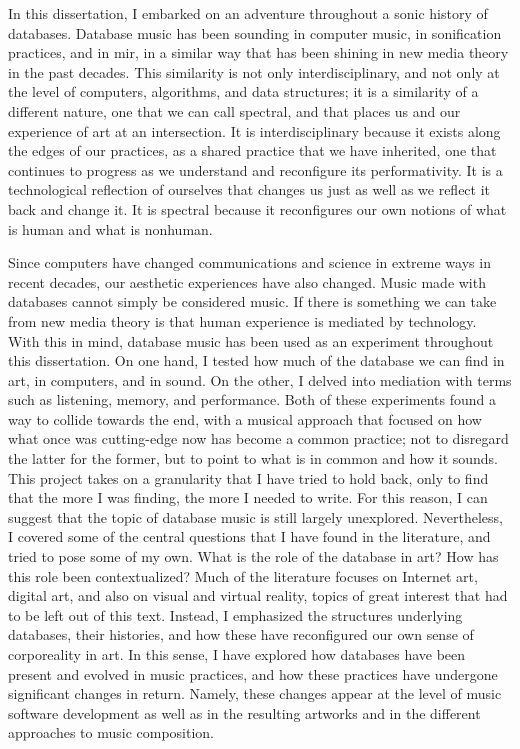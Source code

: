 In this dissertation, I embarked on an adventure throughout a sonic history of databases. Database music has been sounding in computer music, in sonification practices, and in \gls{mir}, in a similar way that has been shining in new media theory in the past decades. This similarity is not only interdisciplinary, and not only at the level of computers, algorithms, and data structures; it is a similarity of a different nature, one that we can call spectral, and that places us and our experience of art at an intersection. It is interdisciplinary because it exists along the edges of our practices, as a shared practice that we have inherited, one that continues to progress as we understand and reconfigure its performativity. It is a technological reflection of ourselves that changes us just as well as we reflect it back and change it. It is spectral because it reconfigures our own notions of what is human and what is nonhuman.

Since computers have changed communications and science in extreme ways in recent decades, our aesthetic experiences have also changed. Music made with databases cannot simply be considered music. If there is something we can take from new media theory is that human experience is mediated by technology. With this in mind, database music has been used as an experiment throughout this dissertation. On one hand, I tested how much of the database we can find in art, in computers, and in sound. On the other, I delved into mediation with terms such as listening, memory, and performance. Both of these experiments found a way to collide towards the end, with a musical approach that focused on how what once was cutting-edge now has become a common practice; not to disregard the latter for the former, but to point to what is in common and how it sounds. This project takes on a granularity that I have tried to hold back, only to find that the more I was finding, the more I needed to write. For this reason, I can suggest that the topic of database music is still largely unexplored. Nevertheless, I covered some of the central questions that I have found in the literature, and tried to pose some of my own. What is the role of the database in art? How has this role been contextualized? Much of the literature focuses on Internet art, digital art, and also on visual and virtual reality, topics of great interest that had to be left out of this text. Instead, I emphasized the structures underlying databases, their histories, and how these have reconfigured our own sense of corporeality in art. In this sense, I have explored how databases have been present and evolved in music practices, and how these practices have undergone significant changes in return. Namely, these changes appear at the level of music software development as well as in the resulting artworks and in the different approaches to music composition. 

